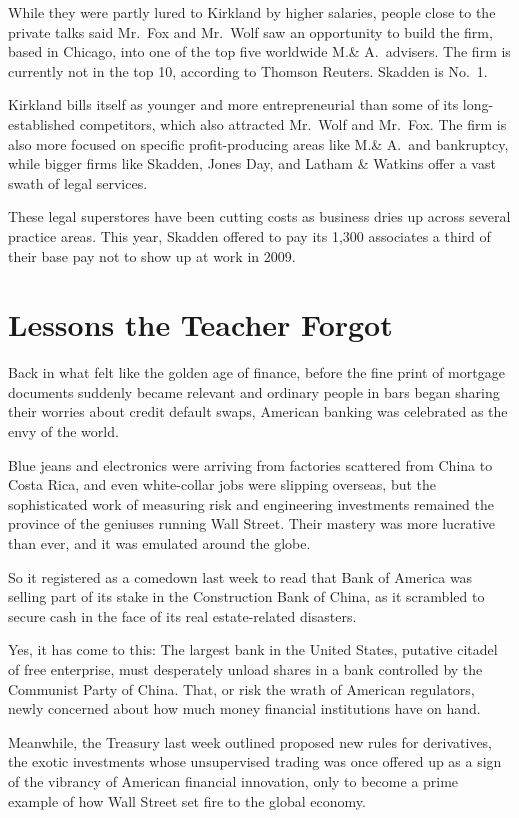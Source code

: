 \documentclass[12pt,a4paper,onecolumn]{article}
\begin{document}
While they were partly lured to Kirkland by higher salaries, people close to the private talks said
Mr.~Fox and Mr.~Wolf saw an opportunity to build the firm, based in Chicago, into one of the top
five worldwide M.\& A.~advisers. The firm is currently not in the top 10, according to Thomson
Reuters. Skadden is No.~1.

Kirkland bills itself as younger and more entrepreneurial than some of its long-established
competitors, which also attracted Mr.~Wolf and Mr.~Fox. The firm is also more focused on specific
profit-producing areas like M.\& A.~and bankruptcy, while bigger firms like Skadden, Jones Day, and
Latham \& Watkins offer a vast swath of legal services.

These legal superstores have been cutting costs as business dries up across several practice areas.
This year, Skadden offered to pay its 1,300 associates a third of their base pay not to show up at
work in 2009.

\section{Lessons the Teacher Forgot}

Back in what felt like the golden age of finance, before the fine print of mortgage documents
suddenly became relevant and ordinary people in bars began sharing their worries about credit
default swaps, American banking was celebrated as the envy of the world.

Blue jeans and electronics were arriving from factories scattered from China to Costa Rica, and even
white-collar jobs were slipping overseas, but the sophisticated work of measuring risk and
engineering investments remained the province of the geniuses running Wall Street. Their mastery was
more lucrative than ever, and it was emulated around the globe.

So it registered as a comedown last week to read that Bank of America was selling part of its stake
in the Construction Bank of China, as it scrambled to secure cash in the face of its real
estate-related disasters.

Yes, it has come to this: The largest bank in the United States, putative citadel of free
enterprise, must desperately unload shares in a bank controlled by the Communist Party of China.
That, or risk the wrath of American regulators, newly concerned about how much money financial
institutions have on hand.

Meanwhile, the Treasury last week outlined proposed new rules for derivatives, the exotic
investments whose unsupervised trading was once offered up as a sign of the vibrancy of American
financial innovation, only to become a prime example of how Wall Street set fire to the global
economy.
\end{document}

